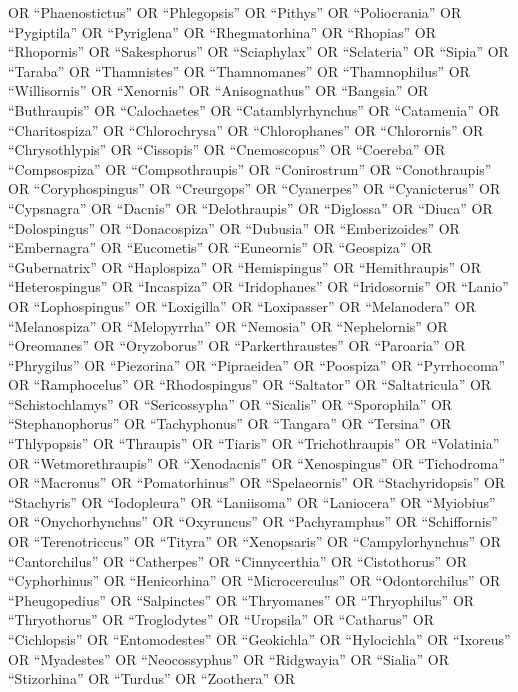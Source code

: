 \documentclass[
  number,
  review,
  onecolumn]{elsarticle}
\begin{document}
OR ``Phaenostictus'' OR ``Phlegopsis'' OR ``Pithys'' OR ``Poliocrania''
OR ``Pygiptila'' OR ``Pyriglena'' OR ``Rhegmatorhina'' OR ``Rhopias'' OR
``Rhopornis'' OR ``Sakesphorus'' OR ``Sciaphylax'' OR ``Sclateria'' OR
``Sipia'' OR ``Taraba'' OR ``Thamnistes'' OR ``Thamnomanes'' OR
``Thamnophilus'' OR ``Willisornis'' OR ``Xenornis'' OR ``Anisognathus''
OR ``Bangsia'' OR ``Buthraupis'' OR ``Calochaetes'' OR
``Catamblyrhynchus'' OR ``Catamenia'' OR ``Charitospiza'' OR
``Chlorochrysa'' OR ``Chlorophanes'' OR ``Chlorornis'' OR
``Chrysothlypis'' OR ``Cissopis'' OR ``Cnemoscopus'' OR ``Coereba'' OR
``Compsospiza'' OR ``Compsothraupis'' OR ``Conirostrum'' OR
``Conothraupis'' OR ``Coryphospingus'' OR ``Creurgops'' OR ``Cyanerpes''
OR ``Cyanicterus'' OR ``Cypsnagra'' OR ``Dacnis'' OR ``Delothraupis'' OR
``Diglossa'' OR ``Diuca'' OR ``Dolospingus'' OR ``Donacospiza'' OR
``Dubusia'' OR ``Emberizoides'' OR ``Embernagra'' OR ``Eucometis'' OR
``Euneornis'' OR ``Geospiza'' OR ``Gubernatrix'' OR ``Haplospiza'' OR
``Hemispingus'' OR ``Hemithraupis'' OR ``Heterospingus'' OR
``Incaspiza'' OR ``Iridophanes'' OR ``Iridosornis'' OR ``Lanio'' OR
``Lophospingus'' OR ``Loxigilla'' OR ``Loxipasser'' OR ``Melanodera'' OR
``Melanospiza'' OR ``Melopyrrha'' OR ``Nemosia'' OR ``Nephelornis'' OR
``Oreomanes'' OR ``Oryzoborus'' OR ``Parkerthraustes'' OR ``Paroaria''
OR ``Phrygilus'' OR ``Piezorina'' OR ``Pipraeidea'' OR ``Poospiza'' OR
``Pyrrhocoma'' OR ``Ramphocelus'' OR ``Rhodospingus'' OR ``Saltator'' OR
``Saltatricula'' OR ``Schistochlamys'' OR ``Sericossypha'' OR
``Sicalis'' OR ``Sporophila'' OR ``Stephanophorus'' OR ``Tachyphonus''
OR ``Tangara'' OR ``Tersina'' OR ``Thlypopsis'' OR ``Thraupis'' OR
``Tiaris'' OR ``Trichothraupis'' OR ``Volatinia'' OR ``Wetmorethraupis''
OR ``Xenodacnis'' OR ``Xenospingus'' OR ``Tichodroma'' OR ``Macronus''
OR ``Pomatorhinus'' OR ``Spelaeornis'' OR ``Stachyridopsis'' OR
``Stachyris'' OR ``Iodopleura'' OR ``Laniisoma'' OR ``Laniocera'' OR
``Myiobius'' OR ``Onychorhynchus'' OR ``Oxyruncus'' OR ``Pachyramphus''
OR ``Schiffornis'' OR ``Terenotriccus'' OR ``Tityra'' OR ``Xenopsaris''
OR ``Campylorhynchus'' OR ``Cantorchilus'' OR ``Catherpes'' OR
``Cinnycerthia'' OR ``Cistothorus'' OR ``Cyphorhinus'' OR
``Henicorhina'' OR ``Microcerculus'' OR ``Odontorchilus'' OR
``Pheugopedius'' OR ``Salpinctes'' OR ``Thryomanes'' OR ``Thryophilus''
OR ``Thryothorus'' OR ``Troglodytes'' OR ``Uropsila'' OR ``Catharus'' OR
``Cichlopsis'' OR ``Entomodestes'' OR ``Geokichla'' OR ``Hylocichla'' OR
``Ixoreus'' OR ``Myadestes'' OR ``Neocossyphus'' OR ``Ridgwayia'' OR
``Sialia'' OR ``Stizorhina'' OR ``Turdus'' OR ``Zoothera'' OR
\end{document}
